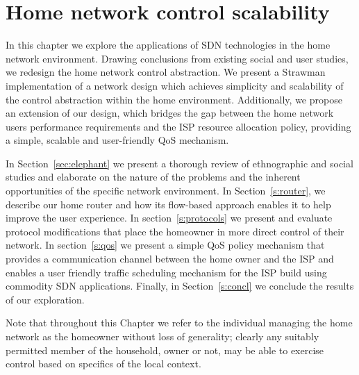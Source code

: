 
\ifpdf
\graphicspath{{Chapter2/Chapter2Figs/PNG/}{Chapter2/Chapter2Figs/PDF/}{Chapter2/Chapter2Figs/}}
\else \graphicspath{{Chapter2/Chapter2Figs/EPS/}{Chapter2/Chapter2Figs/}} \fi

\chapter{Home network control scalability} 

In this chapter we explore the applications of SDN technologies in the home
network environment. Drawing conclusions from existing social and user studies,
we redesign the home network control abstraction. We present a Strawman
implementation of a network design which achieves simplicity and scalability of
the control abstraction within the home environment. Additionally, we propose an
extension of our design, which bridges the gap between the home network users
performance requirements and the ISP resource allocation policy, providing a
simple, scalable and user-friendly QoS mechanism.

In Section~\ref{sec:elephant} we present a thorough review of ethnographic and
social studies and elaborate on the nature of the problems and the inherent
opportunities of the specific network environment. In Section~\ref{s:router}, we
describe our home router and how its flow-based approach enables it to help
improve the user experience. In section~\ref{s:protocols} we present and evaluate
protocol modifications that place the homeowner in more direct control of their
network. In section~\ref{s:qos} we present a simple QoS policy mechanism that
provides a communication channel between the home owner and the ISP and enables
a user friendly traffic scheduling mechanism for the ISP build using commodity
SDN applications. Finally, in Section~\ref{s:concl} we conclude the results of
our exploration.

Note that throughout this Chapter we refer to the individual managing the home
network as the homeowner without loss of generality; clearly any suitably
permitted member of the household, owner or not, may be able to exercise control
based on specifics of the local context. 


